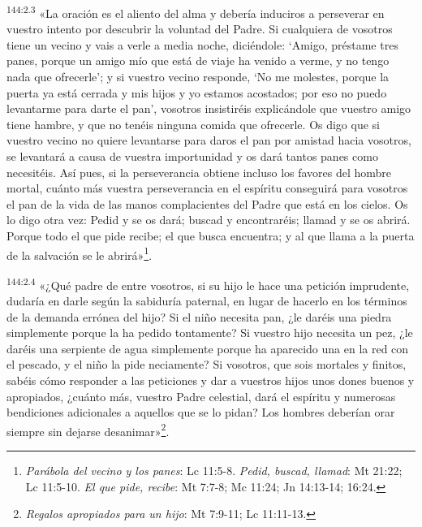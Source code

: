 \par
\textsuperscript{144:2.3} «La oración es el aliento del alma y debería induciros a perseverar en vuestro intento por descubrir la voluntad del Padre. Si cualquiera de vosotros tiene un vecino y vais a verle a media noche, diciéndole: `Amigo, préstame tres panes, porque un amigo mío que está de viaje ha venido a verme, y no tengo nada que ofrecerle'; y si vuestro vecino responde, `No me molestes, porque la puerta ya está cerrada y mis hijos y yo estamos acostados; por eso no puedo levantarme para darte el pan', vosotros insistiréis explicándole que vuestro amigo tiene hambre, y que no tenéis ninguna comida que ofrecerle. Os digo que si vuestro vecino no quiere levantarse para daros el pan por amistad hacia vosotros, se levantará a causa de vuestra importunidad y os dará tantos panes como necesitéis. Así pues, si la perseverancia obtiene incluso los favores del hombre mortal, cuánto más vuestra perseverancia en el espíritu conseguirá para vosotros el pan de la vida de las manos complacientes del Padre que está en los cielos. Os lo digo otra vez: Pedid y se os dará; buscad y encontraréis; llamad y se os abrirá. Porque todo el que pide recibe; el que busca encuentra; y al que llama a la puerta de la salvación se le abrirá»\footnote{\textit{Parábola del vecino y los panes}: Lc 11:5-8. \textit{Pedid, buscad, llamad}: Mt 21:22; Lc 11:5-10. \textit{El que pide, recibe}: Mt 7:7-8; Mc 11:24; Jn 14:13-14; 16:24.}.

\par
\textsuperscript{144:2.4} «¿Qué padre de entre vosotros, si su hijo le hace una petición imprudente, dudaría en darle según la sabiduría paternal, en lugar de hacerlo en los términos de la demanda errónea del hijo? Si el niño necesita pan, ¿le daréis una piedra simplemente porque la ha pedido tontamente? Si vuestro hijo necesita un pez, ¿le daréis una serpiente de agua simplemente porque ha aparecido una en la red con el pescado, y el niño la pide neciamente? Si vosotros, que sois mortales y finitos, sabéis cómo responder a las peticiones y dar a vuestros hijos unos dones buenos y apropiados, ¿cuánto más, vuestro Padre celestial, dará el espíritu y numerosas bendiciones adicionales a aquellos que se lo pidan? Los hombres deberían orar siempre sin dejarse desanimar»\footnote{\textit{Regalos apropiados para un hijo}: Mt 7:9-11; Lc 11:11-13.}.

